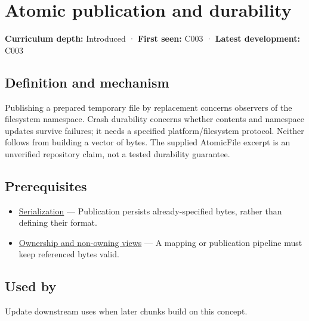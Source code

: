 \hypertarget{appendix-e89a8f290ef5}{}\label{referencestart:appendix-e89a8f290ef5}
\section{Atomic publication and durability}\label{appendix-e89a8f290ef5-atomic-publication-and-durability}

\textbf{Curriculum depth:} Introduced · \textbf{First seen:} C003 · \textbf{Latest development:} C003

\begin{allmightroledefinition}

\subsection{Definition and mechanism}\label{appendix-e89a8f290ef5-definition-and-mechanism}

Publishing a prepared temporary file by replacement concerns observers of the filesystem namespace. Crash durability concerns whether contents and namespace updates survive failures; it needs a specified platform/filesystem protocol. Neither follows from building a vector of bytes. The supplied AtomicFile excerpt is an unverified repository claim, not a tested durability guarantee.

\end{allmightroledefinition}

\subsection{Prerequisites}\label{appendix-e89a8f290ef5-prerequisites}

\begin{itemize}
\tightlist
\item
  \hyperref[appendix-91d09ebed979]{Serialization} --- Publication persists already-specified bytes, rather than defining their format.
\item
  \hyperref[appendix-d52e4486f527]{Ownership and non-owning views} --- A mapping or publication pipeline must keep referenced bytes valid.
\end{itemize}

\subsection{Used by}\label{appendix-e89a8f290ef5-used-by}

Update downstream uses when later chunks build on this concept.

